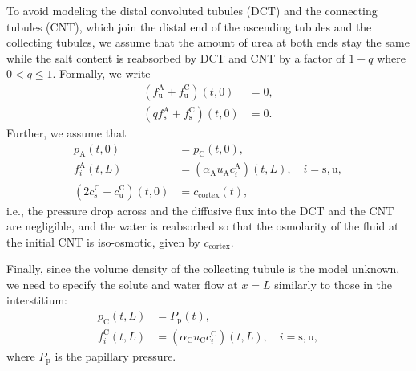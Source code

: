 \documentclass{article}
\begin{document}
To avoid modeling the distal convoluted tubules (DCT) and the connecting tubules (CNT), which join the distal end of the ascending tubules and the collecting tubules, we assume that the amount of urea at both ends stay the same while the salt content is reabsorbed by DCT and CNT by a factor of $1-q$ where $0<q\leq 1$.
Formally, we write
\begin{align}
    \left( f_{\mathrm{u}}^\mathrm{A}+f_\mathrm{u}^\mathrm{C} \right)(t,0) &= 0,\\
    \left( qf_{\mathrm{s}}^\mathrm{A}+f_\mathrm{s}^\mathrm{C} \right)(t,0) &= 0.
\end{align}
Further, we assume that 
\begin{align}
    p_\mathrm{A}(t,0)&= p_{\mathrm{C}}(t,0),\\ 
    f_i^\mathrm{A}(t,L) &= (\alpha_\mathrm{A}  u_\mathrm{A}  c_i^\mathrm{A})(t,L),\quad i = \mathrm{s},\mathrm{u},\\ 
    (2c_\mathrm{s}^\mathrm{C}+c_\mathrm{u}^\mathrm{C})(t,0) &=c_\mathrm{cortex}(t),
\end{align}
    i.e., the pressure drop across and the diffusive flux into the DCT and the CNT are negligible, and the water is reabsorbed so that the osmolarity of the fluid at the initial CNT is iso-osmotic, given by $c_\mathrm{cortex}$.

Finally, since the volume density of the collecting tubule is the model unknown, we need to specify the solute and water flow at $x=L$ similarly to those in the interstitium:
\begin{align}
    p_\mathrm{C} (t,L) &= P_{\mathrm{p}}(t),\\
    f_i^\mathrm{C}(t,L) &= (\alpha_\mathrm{C}  u_\mathrm{C}  c_i^\mathrm{C})(t,L),\quad i=\mathrm{s},\mathrm{u},
\end{align}
    where $P_\mathrm{p}$ is the papillary pressure.
\end{document}
